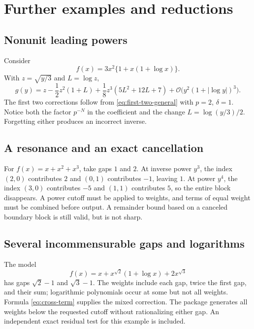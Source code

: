 \documentclass[11pt,a4paper]{article}
\numberwithin{equation}{section}
\theoremstyle{definition}
\theoremstyle{remark}
\newcommand{\OO}{\mathcal O}
\begin{document}
\section{Further examples and reductions}
\label{sec:examples}

\subsection{Nonunit leading powers}

Consider
\[
 f(x)=3x^2\{1+x(1+\log x)\}.
\]
With $z=\sqrt{y/3}$ and $L=\log z$,
\begin{equation}
 g(y)=z-\frac12z^2(1+L)
       +\frac18z^3(5L^2+12L+7)
       +\OO\bigl(y^2(1+|\log y|)^3\bigr).
 \label{eq:leading-two}
\end{equation}
The first two corrections follow from \eqref{eq:first-two-general} with
$p=2$, $\delta=1$. Notice both the factor $p^{-N}$ in the coefficient and
the change $L=\log(y/3)/2$. Forgetting either produces an incorrect inverse.

\subsection{A resonance and an exact cancellation}

For $f(x)=x+x^2+x^3$, take gaps $1$ and $2$. At inverse power $y^3$, the
index $(2,0)$ contributes $2$ and $(0,1)$ contributes $-1$, leaving $1$.
At power $y^4$, the index $(3,0)$ contributes $-5$ and $(1,1)$ contributes
$5$, so the entire block disappears. A power cutoff must be applied to
weights, and terms of equal weight must be combined before output.
A remainder bound based on a canceled boundary block is still valid, but
is not sharp.

\subsection{Several incommensurable gaps and logarithms}

The model
\begin{equation}
 f(x)=x+x^{\sqrt2}(1+\log x)+2x^{\sqrt3}
 \label{eq:mixed}
\end{equation}
has gaps $\sqrt2-1$ and $\sqrt3-1$.
The weights include each gap, twice the first gap, and their sum; logarithmic
polynomials occur at some but not all weights. Formula
\eqref{eq:cross-term} supplies the mixed correction. The package generates
all weights below the requested cutoff without rationalizing either gap.
An independent exact residual test for this example is included.
\end{document}

